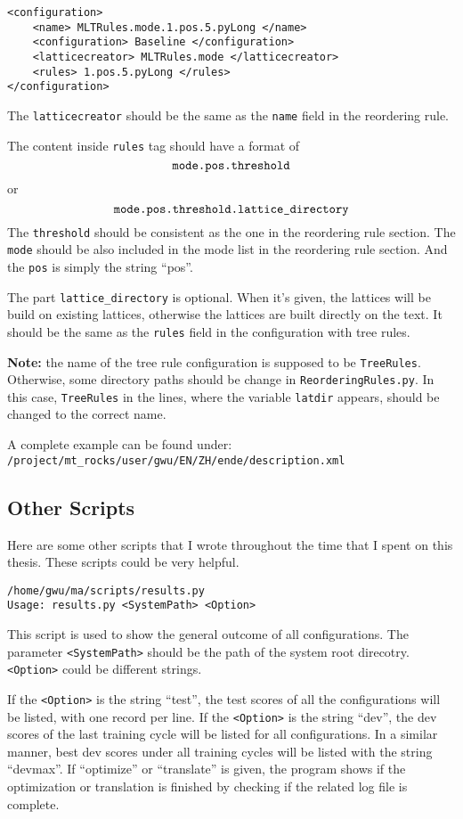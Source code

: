 \begin{Verbatim}[frame=single]
<configuration>
    <name> MLTRules.mode.1.pos.5.pyLong </name>
    <configuration> Baseline </configuration>
    <latticecreator> MLTRules.mode </latticecreator>
    <rules> 1.pos.5.pyLong </rules>
</configuration>
\end{Verbatim}
The \verb|latticecreator| should be the same as the \verb|name| field in the reordering rule. 

The content inside \verb|rules| tag should have a format of $$\verb|mode.pos.threshold|$$ or $$\verb|mode.pos.threshold.lattice_directory|$$ 
The \verb|threshold| should be consistent as the one in the reordering rule section. The \verb|mode| should be also included in the mode list in the reordering rule section. And the \verb|pos| is simply the string ``pos''.

The part \verb|lattice_directory| is optional. When it's given, the lattices will be build on existing lattices, otherwise the lattices are built directly on the text. It should be the same as the \verb|rules| field in the configuration with tree rules. 


\label{note}\textbf{Note:} the name of the tree rule configuration is supposed to be \verb|TreeRules|. Otherwise, some directory paths should be change in \verb|ReorderingRules.py|. In this case, \verb|TreeRules| in the lines, where the variable \verb|latdir| appears, should be changed to the correct name.


A complete example can be found under:\\
\verb|/project/mt_rocks/user/gwu/EN/ZH/ende/description.xml|

\subsection{Other Scripts}

Here are some other scripts that I wrote throughout the time that I spent on this thesis. These scripts could be very helpful.

\verb|/home/gwu/ma/scripts/results.py|\\
\verb|Usage: results.py <SystemPath> <Option>|

This script is used to show the general outcome of all configurations. The parameter \verb|<SystemPath>| should be the path of the system root direcotry. \verb|<Option>| could be different strings.

If the \verb|<Option>| is the string ``test'', the test scores of all the configurations will be listed, with one record per line. If the \verb|<Option>| is the string ``dev'', the dev scores of the last training cycle will be listed for all configurations. In a similar manner, best dev scores under all training cycles will be listed with the string ``devmax''. If ``optimize'' or ``translate'' is given, the program shows if the optimization or translation is finished by checking if the related log file is complete.

